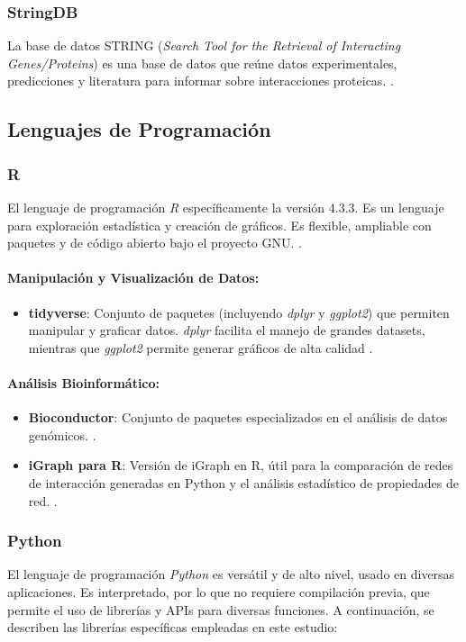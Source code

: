 \subsubsection{StringDB}
La base de datos STRING (\textit{Search Tool for the Retrieval of Interacting Genes/Proteins}) es una base de datos que reúne datos experimentales, predicciones y literatura para informar sobre interacciones proteicas. \cite{szklarczyk2019}.

\subsection{Lenguajes de Programación}

\subsubsection{R}
El lenguaje de programación \textit{R} específicamente la versión 4.3.3. Es un lenguaje para exploración estadística y creación de gráficos. Es flexible, ampliable con paquetes y de código abierto bajo el proyecto GNU. \cite{chan2018}.


\paragraph{Manipulación y Visualización de Datos:}
\begin{itemize}
	\item \textbf{tidyverse}: Conjunto de paquetes (incluyendo \textit{dplyr} y \textit{ggplot2}) que permiten manipular y graficar datos. \textit{dplyr} facilita el manejo de grandes datasets, mientras que \textit{ggplot2} permite generar gráficos de alta calidad \cite{Wickham2019}.
\end{itemize}

\paragraph{Análisis Bioinformático:}
\begin{itemize}
	\item \textbf{Bioconductor}: Conjunto de paquetes especializados en el análisis de datos genómicos. \cite{Huber2015}.
	\item \textbf{iGraph para R}: Versión de iGraph en R, útil para la comparación de redes de interacción generadas en Python y el análisis estadístico de propiedades de red. \cite{Csardi2006}.
\end{itemize}


\subsubsection{Python}
El lenguaje de programación \textit{Python} es versátil y de alto nivel, usado en diversas aplicaciones.  Es interpretado, por lo que no requiere compilación previa, que permite el uso de librerías y APIs para diversas funciones. A continuación, se describen las librerías específicas empleadas en este estudio:

